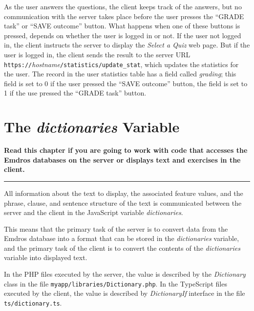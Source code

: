 \documentclass[11pt,oneside,a4paper]{memoir}
\begin{document}
As the user answers the questions, the client keeps track of the answers, but no communication with
the server takes place before the user presses the
``GRADE task''
or ``SAVE outcome'' button. What
happens when one of these buttons is pressed, depends on whether the user is logged in or not. If
the user not logged in, the client instructs the server to display the \emph{Select a Quiz} web
page. But if the user is logged in, the client sends the result to the server URL
\texttt{https://}\textit{hostname}\texttt{/statistics/update\_stat}, which updates the
statistics for the user. The record in the user statistics table has a field
called \emph{grading}; this field is set to 0 if the user pressed the ``SAVE outcome'' button, the
field is set to 1 if the use pressed the ``GRADE task'' button.




\chapter{The \emph{dictionaries} Variable}\label{chap-dictionary}%

\textbf{Read this chapter if you are going to work with code that accesses the Emdros databases on
  the server or displays text and exercises in the client.}
\plainbreak{3}

All information about the text to display, the associated feature values, and the phrase, clause,
and sentence structure of the text is communicated between the server and the client in the
JavaScript variable \emph{dictionaries}.

This means that the primary task of the server is to convert data from the Emdros
database into a format that can be stored in the \emph{dictionaries} variable, and the primary task
of the client is to convert the contents of the \emph{dictionaries} variable into
displayed text.

In the PHP files executed by the server, the value is described by the \emph{Dictionary}%
class in the file \texttt{myapp/libraries/Dictionary.php}. In the TypeScript files executed by the
client, the value is described by \emph{DictionaryIf}%
interface in the file \texttt{ts/dictionary.ts}.
\end{document}
